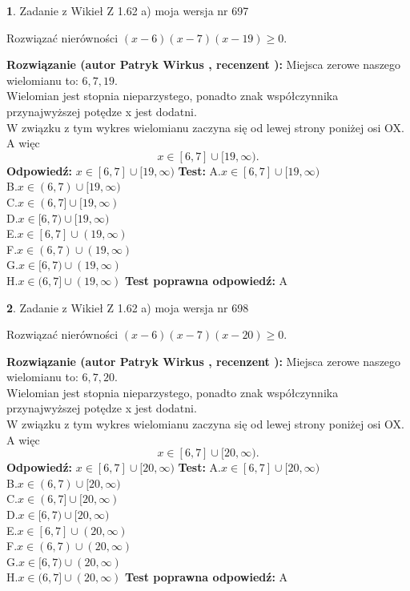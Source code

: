 \documentclass[12pt, a4paper]{article}
\theoremstyle{definition} %
\newtheorem{zad}{}
\newcommand{\zadStart}[1]{\begin{zad}#1\newline}
\newcommand{\zadStop}{\end{zad}}
\newcommand{\rozwStart}[2]{\noindent \textbf{Rozwiązanie (autor #1 , recenzent #2): }\newline}
\newcommand{\rozwStop}{\newline}
\newcommand{\odpStart}{\noindent \textbf{Odpowiedź:}\newline}
\newcommand{\odpStop}{\newline}
\newcommand{\testStart}{\noindent \textbf{Test:}\newline}
\newcommand{\testStop}{\newline}
\newcommand{\kluczStart}{\noindent \textbf{Test poprawna odpowiedź:}\newline}
\newcommand{\kluczStop}{\newline}
\begin{document}
\zadStart{Zadanie z Wikieł Z 1.62 a) moja wersja nr 697}

Rozwiązać nierówności $(x-6)(x-7)(x-19)\ge0$.
\zadStop
\rozwStart{Patryk Wirkus}{}
Miejsca zerowe naszego wielomianu to: $6, 7, 19$.\\
Wielomian jest stopnia nieparzystego, ponadto znak współczynnika przy\linebreak najwyższej potędze x jest dodatni.\\ W związku z tym wykres wielomianu zaczyna się od lewej strony poniżej osi OX. A więc $$x \in [6,7] \cup [19,\infty).$$
\rozwStop
\odpStart
$x \in [6,7] \cup [19,\infty)$
\odpStop
\testStart
A.$x \in [6,7] \cup [19,\infty)$\\
B.$x \in (6,7) \cup [19,\infty)$\\
C.$x \in (6,7] \cup [19,\infty)$\\
D.$x \in [6,7) \cup [19,\infty)$\\
E.$x \in [6,7] \cup (19,\infty)$\\
F.$x \in (6,7) \cup (19,\infty)$\\
G.$x \in [6,7) \cup (19,\infty)$\\
H.$x \in (6,7] \cup (19,\infty)$
\testStop
\kluczStart
A
\kluczStop



\zadStart{Zadanie z Wikieł Z 1.62 a) moja wersja nr 698}

Rozwiązać nierówności $(x-6)(x-7)(x-20)\ge0$.
\zadStop
\rozwStart{Patryk Wirkus}{}
Miejsca zerowe naszego wielomianu to: $6, 7, 20$.\\
Wielomian jest stopnia nieparzystego, ponadto znak współczynnika przy\linebreak najwyższej potędze x jest dodatni.\\ W związku z tym wykres wielomianu zaczyna się od lewej strony poniżej osi OX. A więc $$x \in [6,7] \cup [20,\infty).$$
\rozwStop
\odpStart
$x \in [6,7] \cup [20,\infty)$
\odpStop
\testStart
A.$x \in [6,7] \cup [20,\infty)$\\
B.$x \in (6,7) \cup [20,\infty)$\\
C.$x \in (6,7] \cup [20,\infty)$\\
D.$x \in [6,7) \cup [20,\infty)$\\
E.$x \in [6,7] \cup (20,\infty)$\\
F.$x \in (6,7) \cup (20,\infty)$\\
G.$x \in [6,7) \cup (20,\infty)$\\
H.$x \in (6,7] \cup (20,\infty)$
\testStop
\kluczStart
A
\kluczStop
\end{document}

